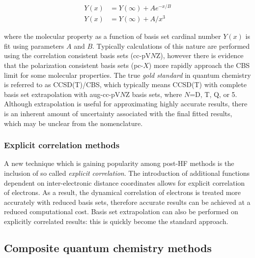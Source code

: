 \begin{align}
  Y(x) &= Y(\infty) + Ae^{-x/B} \\
  Y(x) &= Y(\infty) + A/x^3
\end{align}

\noindent where the molecular property as a function of basis set cardinal number $Y(x)$ is fit using parameters $A$ and $B$. Typically calculations of this nature are performed using the correlation consistent basis sets (cc-pV$N$Z), however there is evidence that the polarization consistent basis sets (pc-$X$) more rapidly approach the CBS limit for some molecular properties.\cite{Kupka2007} The true \emph{gold standard} in quantum chemistry is referred to as CCSD(T)/CBS, which typically means CCSD(T) with complete basis set extrapolation with aug-cc-pV$N$Z basis sets, where $N$=D, T, Q, or 5. Although extrapolation is useful for approximating highly accurate results, there is an inherent amount of uncertainty associated with the final fitted results, which may be unclear from the nomenclature.

\subsubsection{Explicit correlation methods}

A new technique which is gaining popularity among post-HF methods is the inclusion of so called \emph{explicit correlation}.\cite{Shiozaki2008,Kohn2008} The introduction of additional functions dependent on inter-electronic distance coordinates allows for explicit correlation of electrons.\cite{Tenno2012} As a result, the dynamical correlation of electrons is treated more accurately with reduced basis sets, therefore accurate results can be achieved at a reduced computational cost. Basis set extrapolation can also be performed on explicitly correlated results: this is quickly become the standard approach.\cite{Feller2013}


\subsection{Composite quantum chemistry methods}

